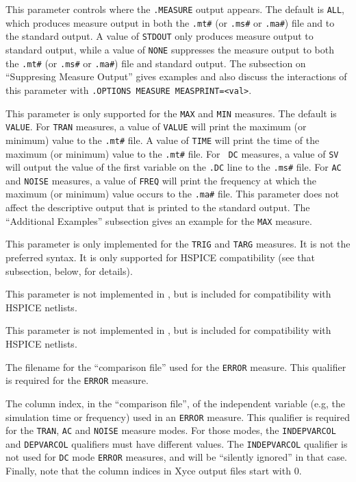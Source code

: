 \begin{Command}
\begin{Arguments}

This parameter controls where the {\tt .MEASURE} output appears.  The
default is {\tt ALL}, which produces measure output in both
the \texttt{.mt\#} (or \texttt{.ms\#} or
\texttt{.ma\#}) file and to the standard output.  A value of
{\tt STDOUT} only produces measure output to standard output, while a
value of {\tt NONE} suppresses the measure output to both
the \texttt{.mt\#} (or \texttt{.ms\#} or \texttt{.ma\#}) file and
standard output.  The subsection on ``Suppresing Measure Output''
gives examples and also discuss the interactions of this parameter
with \texttt{.OPTIONS MEASURE MEASPRINT=<val>}.


This parameter is only supported for the {\tt MAX} and {\tt MIN}
measures.  The default is {\tt VALUE}.  For {\tt TRAN} measures, a
value of {\tt VALUE} will print the maximum (or minimum) value to
the \texttt {.mt\#} file.  A value of {\tt TIME} will print the time
of the maximum (or minimum) value to the \texttt{.mt\#} file. For {\tt
DC} measures, a value of {\tt SV} will output the value of the first
variable on the {\tt .DC} line to the \texttt{.ms\#} file.  For {\tt AC}
and {\tt NOISE} measures, a value of {\tt FREQ} will print the frequency
at which the maximum (or minimum) value occurs to the \texttt{.ma\#} file.
This parameter does not affect the descriptive output that is printed
to the standard output.  The ``Additional Examples'' subsection gives
an example for the {\tt MAX} measure.

This parameter is only implemented for the {\tt TRIG} and {\tt TARG}
measures.  It is not the preferred \Xyce{} syntax. It is only
supported for HSPICE compatibility (see that subsection, below, for
details).


This parameter is not implemented in \Xyce{}, but is included for compatibility
with HSPICE netlists.


This parameter is not implemented in \Xyce{}, but is included for compatibility
with HSPICE netlists.

The filename for the ``comparison file'' used for the {\tt ERROR}
measure.  This qualifier is required for the {\tt ERROR} measure.

The column index, in the ``comparison file'', of the independent
variable (e.g, the simulation time or frequency) used in an {\tt ERROR}
measure.  This qualifier is required for the {\tt TRAN}, {\tt AC} and {\tt NOISE}
measure modes.  For those modes, the {\tt INDEPVARCOL} and {\tt DEPVARCOL}
qualifiers must have different values.  The {\tt INDEPVARCOL}
qualifier is not used for {\tt DC} mode {\tt ERROR} measures, and will
be ``silently ignored'' in that case.  Finally, note that the column
indices in Xyce output files start with 0.


\end{Arguments}
\end{Command}
